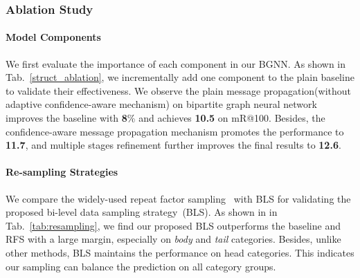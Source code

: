 \subsubsection{Ablation Study}
\label{subsec:abla_sty}


\paragraph{Model Components}
We first evaluate the importance of each component in our BGNN. 
As shown in Tab.~\ref{struct_ablation}, we incrementally add one component to the plain baseline to validate their effectiveness.
We observe the plain message propagation(without adaptive confidence-aware mechanism) on bipartite graph neural network improves the baseline with \textbf{8}\% and achieves \textbf{10.5} on mR@100.
Besides, the confidence-aware message propagation mechanism promotes the performance to \textbf{11.7},
and multiple stages refinement further improves the final results to \textbf{12.6}.


\vspace{-4mm}
\paragraph{Re-sampling Strategies}
We compare the widely-used repeat factor sampling~\cite{gupta_lvis:_2019} with BLS for validating the proposed bi-level data sampling strategy~(BLS).
As shown in in Tab.~\ref{tab:resampling}, we find our proposed BLS outperforms the baseline and RFS with a large margin, especially on \textit{body} and \textit{tail} categories.
Besides, unlike other methods, BLS maintains the performance on head categories. This indicates our sampling can balance the prediction on all category groups.

